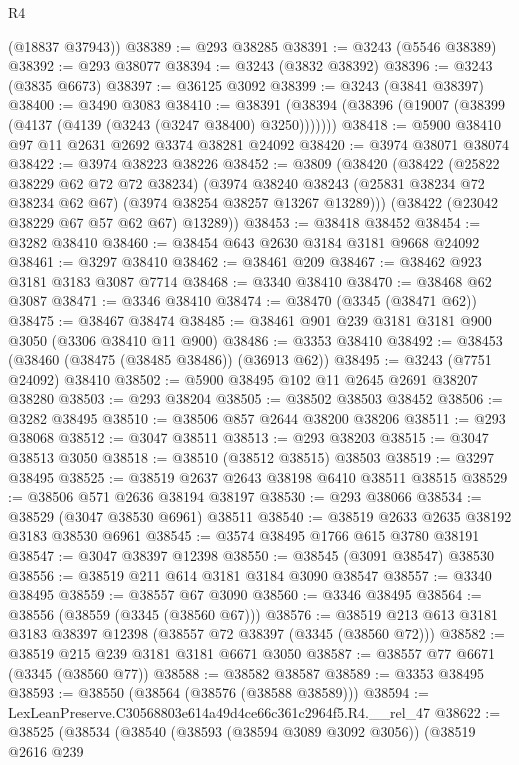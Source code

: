 \begin{lexlean}{R4}
\begin{coremodule}
      (@18837 @37943))
@38389 := @293 @38285
@38391 := @3243 (@5546 @38389)
@38392 := @293 @38077
@38394 := @3243 (@3832 @38392)
@38396 := @3243 (@3835 @6673)
@38397 := @36125 @3092
@38399 := @3243 (@3841 @38397)
@38400 := @3490 @3083
@38410 := @38391 (@38394 (@38396 (@19007 (@38399 (@4137 (@4139 (@3243 (@3247 @38400) @3250)))))))
@38418 := @5900 @38410 @97 @11 @2631 @2692 @3374 @38281 @24092
@38420 := @3974 @38071 @38074
@38422 := @3974 @38223 @38226
@38452 := @3809
    (@38420
      (@38422
        (@25822 @38229 @62 @72 @72 @38234)
        (@3974
          @38240
          @38243
          (@25831 @38234 @72 @38234 @62 @67)
          (@3974 @38254 @38257 @13267 @13289)))
      (@38422 (@23042 @38229 @67 @57 @62 @67) @13289))
@38453 := @38418 @38452
@38454 := @3282 @38410
@38460 := @38454 @643 @2630 @3184 @3181 @9668 @24092
@38461 := @3297 @38410
@38462 := @38461 @209
@38467 := @38462 @923 @3181 @3183 @3087 @7714
@38468 := @3340 @38410
@38470 := @38468 @62 @3087
@38471 := @3346 @38410
@38474 := @38470 (@3345 (@38471 @62))
@38475 := @38467 @38474
@38485 := @38461 @901 @239 @3181 @3181 @900 @3050 (@3306 @38410 @11 @900)
@38486 := @3353 @38410
@38492 := @38453 (@38460 (@38475 (@38485 @38486)) (@36913 @62))
@38495 := @3243 (@7751 @24092) @38410
@38502 := @5900 @38495 @102 @11 @2645 @2691 @38207 @38280
@38503 := @293 @38204
@38505 := @38502 @38503 @38452
@38506 := @3282 @38495
@38510 := @38506 @857 @2644 @38200 @38206
@38511 := @293 @38068
@38512 := @3047 @38511
@38513 := @293 @38203
@38515 := @3047 @38513 @3050
@38518 := @38510 (@38512 @38515) @38503
@38519 := @3297 @38495
@38525 := @38519 @2637 @2643 @38198 @6410 @38511 @38515
@38529 := @38506 @571 @2636 @38194 @38197
@38530 := @293 @38066
@38534 := @38529 (@3047 @38530 @6961) @38511
@38540 := @38519 @2633 @2635 @38192 @3183 @38530 @6961
@38545 := @3574 @38495 @1766 @615 @3780 @38191
@38547 := @3047 @38397 @12398
@38550 := @38545 (@3091 @38547) @38530
@38556 := @38519 @211 @614 @3181 @3184 @3090 @38547
@38557 := @3340 @38495
@38559 := @38557 @67 @3090
@38560 := @3346 @38495
@38564 := @38556 (@38559 (@3345 (@38560 @67)))
@38576 := @38519 @213 @613 @3181 @3183 @38397 @12398 (@38557 @72 @38397 (@3345 (@38560 @72)))
@38582 := @38519 @215 @239 @3181 @3181 @6671 @3050
@38587 := @38557 @77 @6671 (@3345 (@38560 @77))
@38588 := @38582 @38587
@38589 := @3353 @38495
@38593 := @38550 (@38564 (@38576 (@38588 @38589)))
@38594 := LexLeanPreserve.C30568803e614a49d4ce66c361c2964f5.R4.__rel_47
@38622 := @38525
    (@38534
      (@38540
        (@38593 (@38594 @3089 @3092 @3056))
        (@38519
          @2616
          @239

\end{coremodule}
\end{lexlean}
